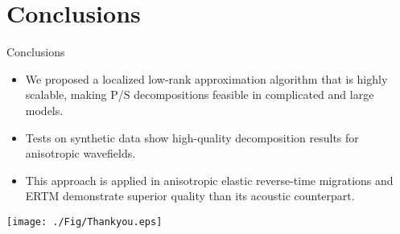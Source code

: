 \documentclass[aspectratio=169]{beamer}
\begin{document}
\section{Conclusions}
\begin{frame}{Conclusions}
\begin{itemize}
\item{We proposed a localized low-rank approximation algorithm that is highly scalable, \newline making P/S decompositions feasible in complicated and large models.
}
\item{
Tests on synthetic data show high-quality decomposition results for anisotropic wavefields.
}
\item{
This approach is applied in anisotropic elastic reverse-time migrations and ERTM demonstrate superior quality than its acoustic counterpart.
}
\end{itemize}
\end{frame}
%
\begin{frame}
\begin{center}
  \texttt{[image: ./Fig/Thankyou.eps]}
\end{center}
\end{frame}
\end{document}

